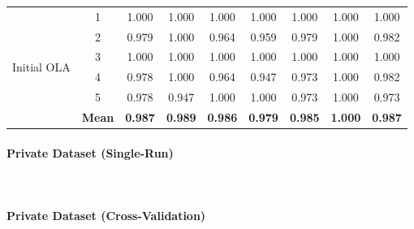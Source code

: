 \documentclass[conference]{IEEEtran}
\begin{document}
\begin{table}[H]
{\begin{tabular}{|l|c|c|c|c|c|c|c|c|}
\multirow{6}{*}{Initial OLA} 
& 1 & 1.000 & 1.000 & 1.000 & 1.000 & 1.000 & 1.000 & 1.000 \\
& 2 & 0.979 & 1.000 & 0.964 & 0.959 & 0.979 & 1.000 & 0.982 \\
& 3 & 1.000 & 1.000 & 1.000 & 1.000 & 1.000 & 1.000 & 1.000 \\
& 4 & 0.978 & 1.000 & 0.964 & 0.947 & 0.973 & 1.000 & 0.982 \\
& 5 & 0.978 & 0.947 & 1.000 & 1.000 & 0.973 & 1.000 & 0.973 \\
& \textbf{Mean} & \textbf{0.987} & \textbf{0.989} & \textbf{0.986} & \textbf{0.979} & \textbf{0.985} & \textbf{1.000} & \textbf{0.987} \\
\hline
\end{tabular}}
\end{table}

\paragraph{Private Dataset (Single-Run)} \mbox{}\\

\begin{table}[H]
\centering
\caption{Single-run performance of baseline models on the private dataset.}
\label{tab:private_single_run}
\end{table}

\paragraph{Private Dataset (Cross-Validation)} \mbox{}\\
\end{document}
